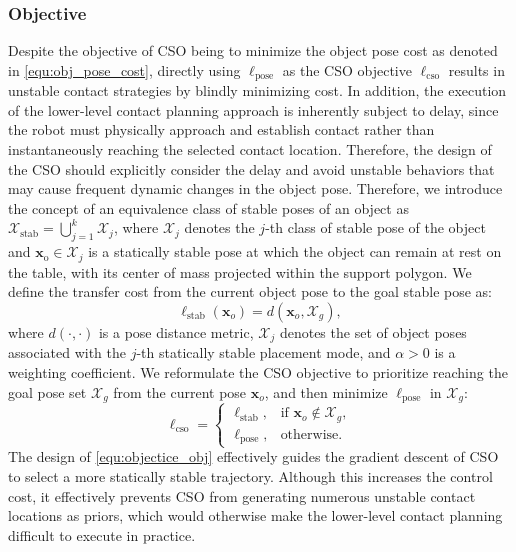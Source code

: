 \subsubsection{Objective}
Despite the objective of CSO being to minimize the object pose cost as denoted in \eqref{equ:obj_pose_cost}, directly using $\ell_{\text{pose}}$ as the CSO objective $\ell_{\text{cso}}$ results in unstable contact strategies by blindly minimizing cost. In addition, the execution of the lower-level contact planning approach is inherently subject to delay, since the robot must physically approach and establish contact rather than instantaneously reaching the selected contact location. Therefore, the design of the CSO should explicitly consider the delay and avoid unstable behaviors that may cause frequent dynamic changes in the object pose. Therefore, we introduce the concept of an equivalence class of stable poses of an object as $\mathcal{X}_{\text{stab}}=\bigcup_{j=1}^{k}\mathcal{X}_{j}$,
where $\mathcal{X}_{j}$ denotes the $j$-th class of stable pose of the object and $\boldsymbol{x}_{\text{o}} \in \mathcal{X}_{j}$ is a statically stable pose at which the object can remain at rest on the table, with its center of mass projected within the support polygon. We define the transfer cost from the current object pose to the goal stable pose as:
\begin{equation}
\ell_{\text{stab}}(\boldsymbol{x}_o)
=
d(\boldsymbol{x}_o,\mathcal{X}_g),
\end{equation}
where $d(\cdot,\cdot)$ is a pose distance metric, $\mathcal{X}_j$ denotes the set of object poses associated with the $j$-th statically stable placement mode, and $\alpha>0$ is a weighting coefficient. We reformulate the CSO objective to prioritize reaching the goal pose set $\mathcal{X}_g$ from the current pose $\boldsymbol{x}_o$, and then minimize $\ell_{\text{pose}}$ in $\mathcal{X}_g$:
\begin{equation}\label{equ:objectice_obj}
\ell_{\text{cso}} =
\begin{cases}
\ell_{\text{stab}}, & \text{if } \boldsymbol{x}_o \notin \mathcal{X}_g, \\
\ell_{\text{pose}}, & \text{otherwise}.
\end{cases}
\end{equation}
The design of \eqref{equ:objectice_obj} effectively guides the gradient descent of CSO to select a more statically stable trajectory. Although this increases the control cost, it effectively prevents CSO from generating numerous unstable contact locations as priors, which would otherwise make the lower-level contact planning difficult to execute in practice.

